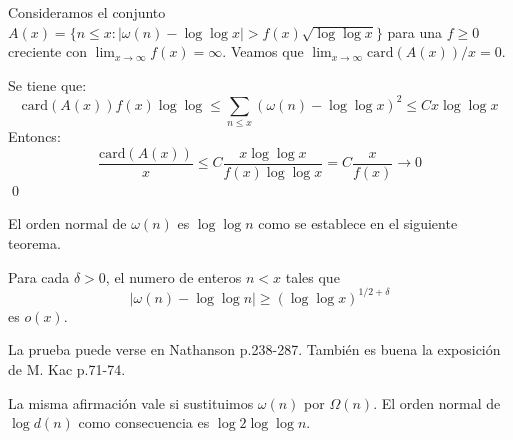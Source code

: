 \documentclass[TAN.tex]{subfiles}
\begin{document}
\begin{coro}
Consideramos el conjunto $A(x)=\{n ≤ x : |ω(n)-\log \log x| > f(x)\sqrt{\log \log x}\}$ para una $f≥0$ creciente con $\lim_{x\to ∞} f(x)=∞$. Veamos que $\lim_{x\to ∞}\text{card}(A(x))/x = 0$. 
\end{coro}
\begin{dem}
Se tiene que:
\[ \text{card}(A(x))f(x)\log \log  ≤ \sum_{n≤x} (ω(n) - \log \log x)^2 ≤ Cx \log \log x \]
Entoncs:
\[ \frac{\text{card}(A(x))}{x} ≤ C \frac{x \log \log x}{f(x) \log \log x} = C \frac{x}{f(x)} \to 0\]
\qed
\end{dem}
El orden normal de $ω(n)$ es $\log \log n$ como se establece en el siguiente teorema.
\begin{teorema}
Para cada $δ > 0$, el numero de enteros $n < x$ tales que
\[ |ω(n) - \log \log n| ≥ (\log \log x)^{1/2+δ} \]
es $ο(x)$.
\end{teorema}
La prueba puede verse en Nathanson p.238-287. También es buena la exposición de M. Kac p.71-74.

La misma afirmación vale si sustituimos $ω(n)$ por $Ω(n)$. El orden normal de $\log d(n)$ como consecuencia es $\log 2 \log \log n$.
\end{document}
